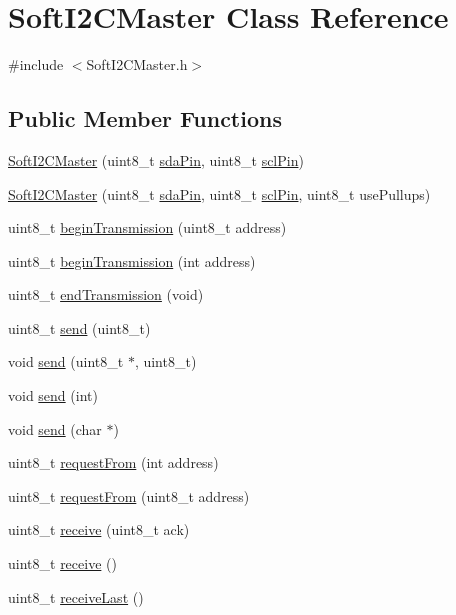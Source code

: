 \hypertarget{class_soft_i2_c_master}{\section{Soft\-I2\-C\-Master Class Reference}
\label{class_soft_i2_c_master}
}


{\ttfamily \#include $<$Soft\-I2\-C\-Master.\-h$>$}

\subsection*{Public Member Functions}
\begin{DoxyCompactItemize}
\item 
\hyperlink{class_soft_i2_c_master_a80269771e2fc8962bd5b7590158cf340}{Soft\-I2\-C\-Master} (uint8\-\_\-t \hyperlink{_gemini_light_8ino_afa6793708eee64e6f0f328cbc61b5b22}{sda\-Pin}, uint8\-\_\-t \hyperlink{_gemini_light_8ino_a22f7ca6ca71734a01a826f4abd36e13e}{scl\-Pin})
\item 
\hyperlink{class_soft_i2_c_master_af9970ff2978681dd6d61186434f493f9}{Soft\-I2\-C\-Master} (uint8\-\_\-t \hyperlink{_gemini_light_8ino_afa6793708eee64e6f0f328cbc61b5b22}{sda\-Pin}, uint8\-\_\-t \hyperlink{_gemini_light_8ino_a22f7ca6ca71734a01a826f4abd36e13e}{scl\-Pin}, uint8\-\_\-t use\-Pullups)
\item 
uint8\-\_\-t \hyperlink{class_soft_i2_c_master_ac39c24535036972ca9e6fa79819d5d9e}{begin\-Transmission} (uint8\-\_\-t address)
\item 
uint8\-\_\-t \hyperlink{class_soft_i2_c_master_a791bec13d09f3e1e49fbd7c72b1fd12d}{begin\-Transmission} (int address)
\item 
uint8\-\_\-t \hyperlink{class_soft_i2_c_master_aefc6d650a9b55fc313f101c90fb2a4a1}{end\-Transmission} (void)
\item 
uint8\-\_\-t \hyperlink{class_soft_i2_c_master_a1a8c899d3bf87bcf82a6d1688ed3209f}{send} (uint8\-\_\-t)
\item 
void \hyperlink{class_soft_i2_c_master_abc589462a3fa60debefb42b855b347b4}{send} (uint8\-\_\-t $\ast$, uint8\-\_\-t)
\item 
void \hyperlink{class_soft_i2_c_master_ae7c861a998e56ed481e3a5a9c3e54dfb}{send} (int)
\item 
void \hyperlink{class_soft_i2_c_master_ac3952f9139b53d2c8f37cca9efe02434}{send} (char $\ast$)
\item 
uint8\-\_\-t \hyperlink{class_soft_i2_c_master_aa59620fa4bd961b21a4ffef3e66e1060}{request\-From} (int address)
\item 
uint8\-\_\-t \hyperlink{class_soft_i2_c_master_a7da6a512db82ea053e1b625199d26f95}{request\-From} (uint8\-\_\-t address)
\item 
uint8\-\_\-t \hyperlink{class_soft_i2_c_master_afd5a89875814ef060773a2a198a2e752}{receive} (uint8\-\_\-t ack)
\item 
uint8\-\_\-t \hyperlink{class_soft_i2_c_master_afe5aba2a3a0b2bbf426f2c7e6d02f6b7}{receive} ()
\item 
uint8\-\_\-t \hyperlink{class_soft_i2_c_master_a77f7f5bde860f3db779f98b1be49e934}{receive\-Last} ()
\end{DoxyCompactItemize}


